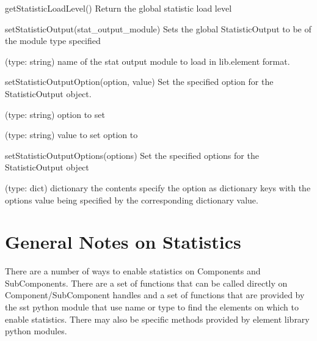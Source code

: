 \begin{functiondoc}{getStatisticLoadLevel()}{
    Return the global statistic load level
  }


\end{functiondoc}


\begin{functiondoc}{setStatisticOutput(stat_output_module)}{
    Sets the global StatisticOutput to be of the module type specified
  }
  
   (type: string) name of the stat output
  module to load in lib.element format.

  \noreturn
\end{functiondoc}
 

\begin{functiondoc}{setStatisticOutputOption(option, value)}{
    Set the specified option for the StatisticOutput object.
  }

   (type: string) option to set

   (type: string) value to set option to

  \noreturn
\end{functiondoc}


\begin{functiondoc}{setStatisticOutputOptions(options)}{
    Set the specified options for the StatisticOutput object
  }
  
   (type: dict) dictionary the contents specify the
  option as dictionary keys with the options value being specified by
  the corresponding dictionary value.

  \noreturn
\end{functiondoc}



\section{General Notes on Statistics}
\label{sec:gen-notes-stats}

There are a number of ways to enable statistics on Components and
SubComponents.  There are a set of functions that can be called
directly on Component/SubComponent handles and a set of functions that
are provided by the sst python module that use name or type to find
the elements on which to enable statistics.  There may also be
specific methods provided by element library python modules.


